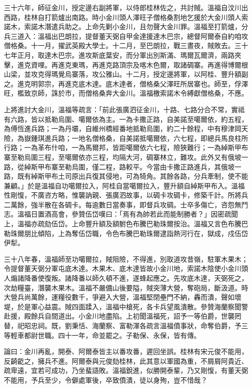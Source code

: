 \begin{pinyinscope}
三十六年，師征金川，授定邊右副將軍，以侍郎桂林佐之，共討賊。溫福自汶川出西路，桂林自打箭爐出南路。時小金川頭人澤旺子僧格桑割地乞援於大金川頭人索諾木，索諾木潛遣兵助之。上命先剿小金川，且勿聲大金川罪。溫福至打箭爐，分兵三道入：溫福出巴朗拉，提督董天弼自甲金達援達木巴宗，總督阿爾泰自約咱攻僧格桑。十一月，擢武英殿大學士。十二月，至巴朗拉，戰三晝夜，賊敗去。三十七年正月，取達木巴宗。進攻斯底葉安，而分軍出別斯滿、瑪爾瓦爾濟，兩路夾擊，進克資哩。再進克東瑪，再進克路頂宗及喀木色爾，取諸碉寨。再進得博爾根山梁，並攻克得瑪覺烏寨落，攻公雅山。十二月，授定邊將軍，以阿桂、豐升額副之。進克明郭宗，再進克底木達。底木達者，僧格桑父澤旺所居寨也。師至，俘澤旺，檻致京師，誅於市，而僧格桑奔大金川。溫福檄索諾木令縛獻僧格桑，不應。

上將進討大金川，溫福等疏言：「前此張廣泗征金川，十路、七路分合不常，實祗有六路，皆以抵勒烏圍、噶爾依為主。一為卡撒正路，自美諾至噶爾依，約五程，為傅恆進兵路；一為丹壩，自維州橋經番地抵勒烏圍，約二十餘程，中有穆津岡天險，為嶽鍾琪進兵路；一地名僧格桑，自美諾抵噶爾依，六七程，即總兵馬良柱所行路；一為革布什咱，一為馬爾邦，皆距噶爾依六七程，險狹難行；一為綽斯甲布寨至勒烏圍三程，至噶爾依亦三程，均隔大河，碉寨林立，難攻。此外又有俄坡一路，從綽斯甲布寨至勒烏圍，僅二程，路較平。今當由卡撒正路進兵，其俄坡一路，既有綽斯甲布土司原出兵復其侵地，可為犄角。其餘各路，分兵牽制，使不能兼顧。」於是溫福自功噶爾拉入，阿桂自當噶爾拉入，豐升額自綽斯甲布入。溫福性剛愎，不廣咨方略，惟襲訥親、張廣泗故事，以碉卡攻碉卡，修築千計。所將兵二萬餘，強半散在各碉卡。每逾數日當奏事，即督兵攻碉。士卒多傷亡，咨怨無鬥志。溫福日置酒高會，參贊伍岱嘆曰：「焉有為帥若此而能制勝者？」因密疏聞上，溫福亦疏劾伍岱。上命豐升額及額駙色布騰巴勒珠爾按治。溫福又言色布騰巴勒珠爾朋比傾陷，上為奪伍岱職，令色布騰巴勒珠爾逮詣熱河行在，獄成，戍伍岱伊犁。

三十八年春，溫福師至功噶爾拉，賊阻險，不得進，別取道攻昔嶺，駐軍木果木；令提督董天弼分軍屯底木達。木果木、底木達皆故小金川地，索諾木陰使小金川頭人煽諸降番使復叛。諸降番以師久頓不進，遂蜂起應之。先攻底木達，天弼死之，次劫糧臺，潛襲木果木。溫福不嚴備山後要隘，賊突薄大營，奪砲局，斷汲道。時大營兵尚萬餘，運糧役數千，爭避入大營，溫福堅閉壘門不納，轟而潰，聲如壞堤，於是軍心益震。賊四面蹂入，溫福中槍死，各卡兵望風潰散。參贊海蘭察聞警赴援，殿餘兵自間道出。小金川地盡陷。上初聞溫福死，詔予一等伯爵，世襲罔替，祀昭忠祠。既，劉秉恬、海蘭察、富勒渾各疏言溫福僨事狀，命奪伯爵，予三等輕車都尉世職。四十一年，命並罷之。子勒保、永保，皆有傳。

論曰：金川再亂，開泰、阿爾泰皆主以番攻番，遲回坐誤。桂林有宋元俊不能用，反齮齕之，擁兵不進。阿爾泰與元俊劾桂林，此其意以軍國為重，不屑屑阿貴近、疏卑遠，宜若可成功，乃坐蜚語敗。溫福銳進，似勝開泰輩，乃又剛愎，有董天弼不能用，予兵至少，令僻處軍後，卒致僨潰，徒以身殉，豈不惜哉？


\end{pinyinscope}